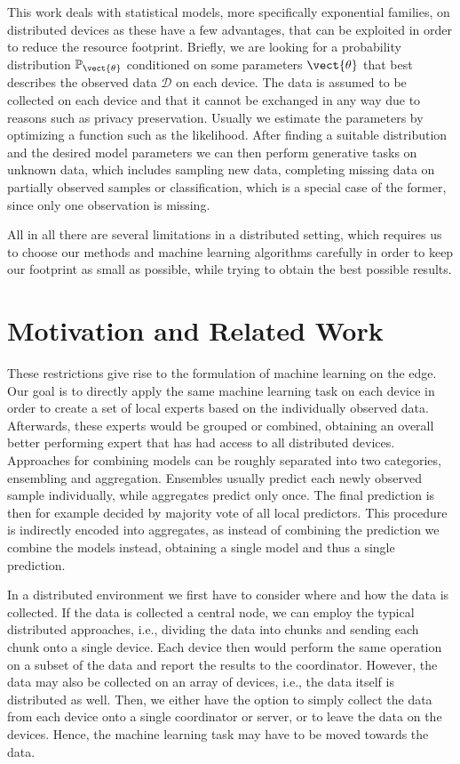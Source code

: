 This work deals with statistical models, more specifically exponential families, on distributed devices as these have a few advantages, that can be exploited in order to reduce the resource footprint.
Briefly, we are looking for a probability distribution $\mathbb{P}_{\vect{\theta}}$ conditioned on some parameters $\vect{\theta}$ that best describes the observed data $\mathcal{D}$ on each device.
The data is assumed to be collected on each device and that it cannot be exchanged in any way due to reasons such as privacy preservation.
Usually we estimate the parameters by optimizing a function such as the likelihood.
After finding a suitable distribution and the desired model parameters we can then perform generative tasks on unknown data, which includes sampling new data, completing missing data on partially observed samples or classification, which is a special case of the former, since only one observation is missing.

All in all there are several limitations in a distributed setting, which requires us to choose our methods and machine learning algorithms carefully in order to keep our footprint as small as possible, while trying to obtain the best possible results.


\section{Motivation and Related Work}

These restrictions give rise to the formulation of machine learning on the edge. 
Our goal is to directly apply the same machine learning task on each device in order to create a set of local experts based on the individually observed data.
Afterwards, these experts would be grouped or combined, obtaining an overall better performing expert 
that has had access to all distributed devices.
Approaches for combining models can be roughly separated into two categories, ensembling and aggregation. 
Ensembles usually predict each newly observed sample individually, while aggregates predict only once.
The final prediction is then for example decided by majority vote of all local predictors.
This procedure is indirectly encoded into aggregates, as instead of combining the prediction we combine the models instead, obtaining a single model and thus a single prediction.

In a distributed environment we first have to consider where and how the data is collected. 
If the data is collected a central node, we can employ the typical distributed approaches, i.e., dividing the data into chunks and sending each chunk onto a single device.
Each device then would perform the same operation on a subset of the data and report the results to the coordinator.
However, the data may also be collected on an array of devices, i.e., the data itself is distributed as well.
Then, we either have the option to simply collect the data from each device onto a single coordinator or server, or to leave the data on the devices. 
Hence, the machine learning task may have to be moved towards the data.

